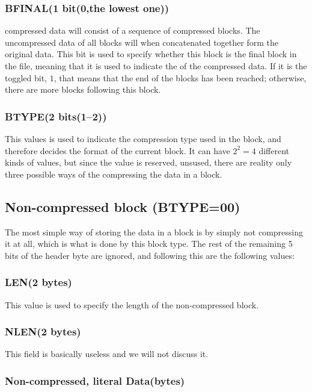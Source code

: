 \subsubsection{BFINAL(1 bit(0,the lowest one))}

 compressed data will consist of a sequence of compressed
blocks. The uncompressed data of all blocks will when concatenated
together form the original data. This bit is used to specify whether
this block is the final block in the file, meaning that it is used to
indicate the of the compressed data. If it is the toggled bit, $1$,
that means that the end of the blocks has been reached; otherwise,
there are more blocks following this block.

\subsubsection{BTYPE(2 bits(1--2))}

This values is used to indicate the compression type used in the
block, and therefore decides the format of the current block. It can
have $2^2 = 4$ different kinds of values, but since the value 
is reserved, unsused, there are reality only three possible ways of
the compressing the data in a block.

\subsection{Non-compressed block (BTYPE=00)}

The most simple way of storing the data in a block is by simply not
compressing it at all, which is what is done by this block type. The
rest of the remaining 5 bits of the header byte are ignored, and
following this are the following values:

\subsubsection{LEN(2 bytes)}

This value is used to specify the length of the non-compressed block.

\subsubsection{NLEN(2 bytes)}

This field is basically useless and we will not discuss it.

\subsubsection{Non-compressed, literal Data(bytes)}


